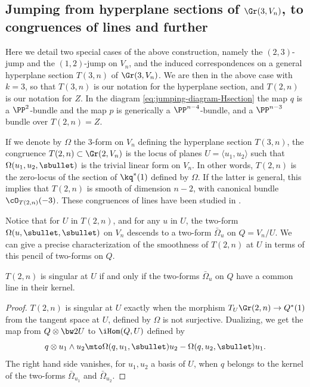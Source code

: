 \subsection{Jumping from hyperplane sections of $\Gr(3,V_n)$, to congruences of lines and further}

Here we detail two special cases of the above construction, namely the $(2,3)$-jump and the $(1,2)$-jump on $V_n$, and the induced correspondences on a general hyperplane section $T(3,n)$ of $\Gr(3,V_n)$. We are then in the above case with $k=3$, so that $T(3,n)$ is our notation for the hyperplane section, and $T(2,n)$ is our notation for $Z$. In the diagram \eqref{eq:jumping-diagram-Hsection} the map $q$ is a $\PP^2$-bundle and the map $p$ is generically a $\PP^{n-4}$-bundle, and a $\PP^{n-3}$ bundle over $T(2,n)=Z$.

If we denote by $\Omega$ the $3$-form on $V_n$ defining the hyperplane section $T(3,n)$, the congruence $T(2,n) \subset \Gr(2,V_n)$ is the locus of planes $U=\langle
u_1, u_2\rangle$ such that $\Omega(u_1,u_2,\sbullet)$ is the trivial linear form on $V_n$. In other
words, $T(2,n)$ is the zero-locus of the section of $\kq^*(1)$ defined by $\Omega$. If the latter
is general, this implies that $T(2,n)$ is smooth of dimension $n-2$, with canonical bundle
$\cO_{T(2,n)}(-3)$. These congruences of lines have been studied in \cite{dpfmr}.

Notice that for $U$ in $T(2,n)$, and for any $u$ in $U$, the two-form $\Omega(u,\sbullet,\sbullet)$ on $V_n$
descends to a two-form $\bar\Omega_u$ on $Q=V_n/U$. We can give a precise characterization of the smoothness of $T(2,n)$ at $U$ in terms of this pencil of two-forms on $Q$.

\begin{lemma}
$T(2,n)$ is singular at $U$ if and only if the two-forms $\bar\Omega_u$ on $Q$ have
a common line in their kernel.
\end{lemma}

\begin{proof}
$T(2,n)$ is singular at $U$ exactly when the morphism $T_U\Gr(2,n)\to Q^*(1)$ from the tangent space at $U$, defined
by $\Omega$ is not surjective. Dualizing, we get the map from $Q\otimes\bw2U$
to $\iHom(Q,U)$ defined by\vspace*{-3pt}\enlargethispage{\baselineskip}%
\[
q\otimes u_1\wedge u_2 \mto \Omega(q,u_1,\sbullet)u_2-\Omega(q,u_2,\sbullet)u_1.
\]
The right hand side vanishes, for $u_1, u_2$ a basis of $U$, when $q$ belongs to the
kernel of the two-forms $\bar\Omega_{u_1}$ and $\bar\Omega_{u_2}$.\end{proof}

